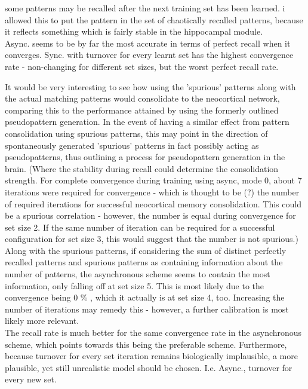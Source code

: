 
some patterns may be recalled after the next training set has been learned. i allowed this to put the pattern in the set of chaotically recalled patterns, because it reflects something which is fairly stable in the hippocampal module.
\\

Async. seems to be by far the most accurate in terms of perfect recall when it converges. Sync. with turnover for every learnt set has the highest convergence rate - non-changing for different set sizes, but the worst perfect recall rate.

It would be very interesting to see how using the 'spurious' patterns along with the actual matching patterns would consolidate to the neocortical network, comparing this to the performance attained by using the formerly outlined pseudopattern generation. In the event of having a similar effect from pattern consolidation using spurious patterns, this may point in the direction of spontaneously generated 'spurious' patterns in fact possibly acting as pseudopatterns, thus outlining a process for pseudopattern generation in the brain. (Where the stability during recall could determine the consolidation strength. For complete convergence during training using async, mode 0, about 7 iterations were required for convergence - which is thought to be (?) the number of required iterations for successful neocortical memory consolidation. This could be a spurious correlation - however, the number is equal during convergence for set size 2. If the same number of iteration can be required for a successful configuration for set size 3, this would suggest that the number is not spurious.)
\\

Along with the spurious patterns, if considering the sum of distinct perfectly recalled patterns and spurious patterns as containing information about the number of patterns, the asynchronous scheme seems to contain the most information, only falling off at set size 5. This is most likely due to the convergence being 0 \% , which it actually is at set size 4, too. Increasing the number of iterations may remedy this - however, a further calibration is most likely more relevant.
\\

The recall rate is much better for the same convergence rate in the asynchronous scheme, which points towards this being the preferable scheme. Furthermore, because turnover for every set iteration remains biologically implausible, a more plausible, yet still unrealistic model should be chosen. I.e. Async., turnover for every new set.

